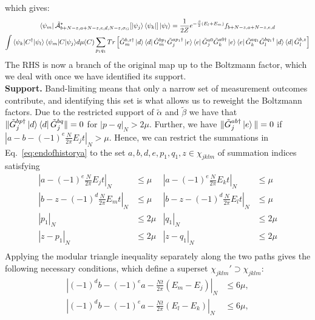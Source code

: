 \documentclass[aps,floatfix,10pt,amssymb,amsfont,amsmath,superscriptaddress,float,nofootinbib,longbibliography,nobalancelastpage,twocolumn]{revtex4-2}
\begin{document}
which gives:
\begin{multline}
 \bra{\psi_m}\tilde{\mathcal{A}}^*_{b+N-z,a+N-z,e,d,N-z,\sigma_G}[\ket{\psi_j}\bra{\psi_k}]\ket{\psi_l}  = \frac{1}{2Z} e^{-\frac{\beta}{2}(E_l+E_m)}{f_{b+N-z,a+N-z,e,d}} \\\int {\braket{\psi_k|C^{\dagger}|\psi_l}\braket{\psi_m|C|\psi_j}} d\mu(C)\sum_{p_1q_1} Tr\left[ {\tilde G_m^{b, z\dagger}\ket{d}\bra{d}\tilde G_m^{bp_1}} {\tilde G^{ap_1\dagger}_j\ket{e}\bra{e}\tilde G^{a0}_j } \tilde G^{a0\dagger}_k\ket{e}\bra{e}\tilde G^{aq_1}_k \tilde G_l^{bq_1\dagger}\ket{d}\bra{d}\tilde G_l^{b,z}\right]
 \label{eq:endofhistorya}
\end{multline}
The RHS is now a branch of the original map up to the Boltzmann factor, which we deal with once we have identified its support.\\
\textbf{Support.} Band-limiting means that only a narrow set of measurement outcomes contribute, and identifying this set is what allows us to reweight the Boltzmann factors. Due to the restricted support of $\tilde \alpha$ and $\tilde \beta$ we have that $\|\tilde G^{bp\dagger}_{j}\ket{d}\bra{d}\tilde G^{bq}_{j}\| = 0$ for $|p-q|_{N} > 2\mu$. Further, we have $\|\tilde G^{ab \dagger}_j \ket{e}\| = 0$ if $|a-b-(-1)^e\frac{N}{2\pi}E_{j}t|_{N} > \mu$. Hence, we can restrict the summations in Eq.~\eqref{eq:endofhistorya}  to the set $a,b,d,e,p_1,q_1,z \in \chi_{jklm}$ of summation indices satisfying
\begin{equation}
\begin{aligned}
    |a-(-1)^e\frac{N}{2\pi}E_jt|_{N} &\leq \mu  &|a-(-1)^e\frac{N}{2\pi}E_kt|_{N} &\leq \mu\\
       |b-z-(-1)^{d}\frac{N}{2\pi}E_mt|_{N}& \leq \mu&|b-z-(-1)^{d}\frac{N}{2\pi}E_lt|_{N} &\leq \mu \\
    |p_1|_{N}&\leq 2\mu&  |q_1|_{N}&\leq 2\mu \\
    |z-p_1|_{N}&\leq 2\mu&  |z-q_1|_{N}&\leq 2\mu \\
\end{aligned}
\label{eq:conds}
\end{equation}
Applying the modular triangle inequality separately along the two paths gives the following necessary conditions, which define a superset $\chi_{jklm}'\supset\chi_{jklm}$:
\begin{equation}
\label{eq:condJ}
\begin{aligned}
    \left|(-1)^db -(-1)^ea-\frac{Nt}{2\pi}(E_m-E_j)\right|_{N}&\leq 6\mu,\\
    \left|(-1)^db -(-1)^ea-\frac{Nt}{2\pi}(E_l-E_k)\right|_{N}&\leq 6\mu,
\end{aligned}
\end{equation}
\end{document}
